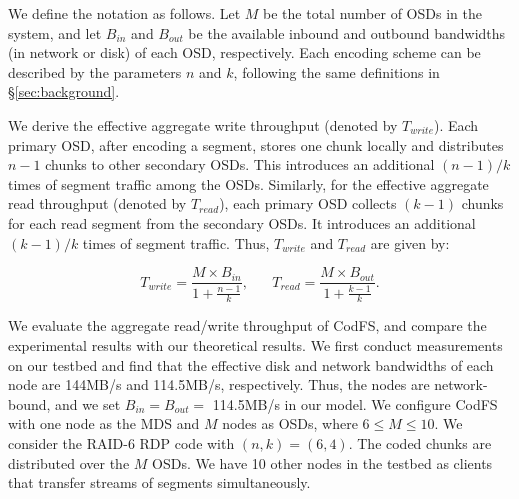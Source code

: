 We define the notation as follows.  Let $M$ be the total number of OSDs in the
system, and let $B_{in}$ and $B_{out}$ be the available inbound and outbound
bandwidths (in network or disk) of each OSD, respectively.  Each encoding scheme
can be described by the parameters $n$ and $k$, following the same definitions
in \S\ref{sec:background}.  

We derive the effective aggregate write throughput (denoted by
$T_{write}$).  Each primary OSD, after encoding a segment, stores one chunk
locally and distributes $n-1$ chunks to other secondary OSDs.  This introduces
an additional $(n-1)/k$ times of segment traffic among the OSDs.
Similarly, for the effective aggregate read throughput (denoted by
$T_{read}$), each primary OSD collects $(k-1)$ chunks for each read segment
from the secondary OSDs. It introduces an additional $(k-1)/k$ times of segment
traffic.  Thus, $T_{write}$ and $T_{read}$ are given by: 

\vspace{-5pt}
\begin{equation*}
    T_{write} = \frac{M\times B_{in}}{1+\frac{n-1}{k}} , \hspace{20pt}
    T_{read} = \frac {M\times B_{out}}{1+\frac{k-1}{k}}.
\end{equation*}


We evaluate the aggregate read/write throughput of CodFS, and compare the
experimental results with our theoretical results.  We first conduct
measurements on our testbed and find that the effective disk and network
bandwidths of each node are 144MB/s and 114.5MB/s, respectively.  Thus,
the nodes are network-bound, and we set $B_{in}\!=\!B_{out}\!=$ 114.5MB/s in
our model.  We configure CodFS with one node as the MDS and $M$ nodes as OSDs,
where $6\!\le\!M\!\le\!10$.  We consider the RAID-6 RDP code \cite{corbett04}
with $(n,k) = (6,4)$.  The coded chunks are distributed over the $M$ OSDs.  We
have 10 other nodes in the testbed as clients that transfer streams of
segments simultaneously. 

